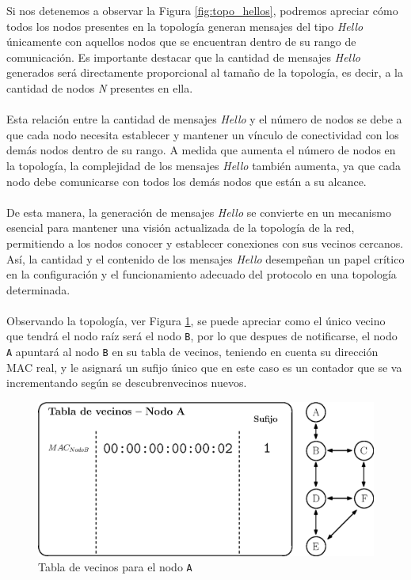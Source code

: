 Si nos detenemos a observar la Figura \ref{fig:topo_hellos}, podremos apreciar cómo todos los nodos presentes en la topología generan mensajes del tipo \textit{Hello} únicamente con aquellos nodos que se encuentran dentro de su rango de comunicación. Es importante destacar que la cantidad de mensajes \textit{Hello} generados será directamente proporcional al tamaño de la topología, es decir, a la cantidad de nodos \textit{N} presentes en ella.\\
\\
Esta relación entre la cantidad de mensajes \textit{Hello} y el número de nodos se debe a que cada nodo necesita establecer y mantener un vínculo de conectividad con los demás nodos dentro de su rango. A medida que aumenta el número de nodos en la topología, la complejidad de los mensajes \textit{Hello} también aumenta, ya que cada nodo debe comunicarse con todos los demás nodos que están a su alcance.\\
\\
De esta manera, la generación de mensajes \textit{Hello} se convierte en un mecanismo esencial para mantener una visión actualizada de la topología de la red, permitiendo a los nodos conocer y establecer conexiones con sus vecinos cercanos. Así, la cantidad y el contenido de los mensajes \textit{Hello} desempeñan un papel crítico en la configuración y el funcionamiento adecuado del protocolo en una topología determinada.\\
\\
Observando la topología, ver Figura \ref{fig:topo_hello_nodoA_nb}, se puede apreciar como el único vecino que tendrá el nodo raíz será el nodo \texttt{B}, por lo que despues de notificarse, el nodo \texttt{A} apuntará al nodo \texttt{B} en su tabla de vecinos, teniendo en cuenta su dirección MAC real, y le asignará un sufijo único que en este caso es un contador que se va incrementando según se descubrenvecinos nuevos.

\begin{figure}[ht!]
    \centering
    \includegraphics[width=\textwidth]{archivos/img/dev/topo_hello_nodoA_nb.eps}
    \caption{Tabla de vecinos para el nodo \texttt{A}}
    \label{fig:topo_hello_nodoA_nb}
\end{figure}

